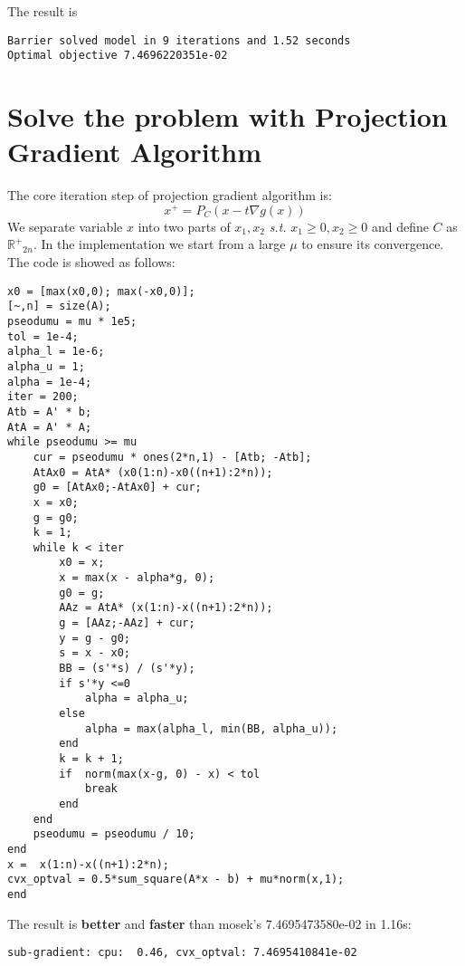 \documentclass[11pt, oneside]{article}   	%
\begin{document}
The result is 
\lstset{
 frame=single, 
breaklines=true,
language=MATLAB,
 }
\begin{lstlisting}
Barrier solved model in 9 iterations and 1.52 seconds
Optimal objective 7.4696220351e-02
\end{lstlisting}

\section{Solve the problem with Projection Gradient Algorithm}
The core iteration step of projection gradient algorithm is:
\begin{equation}
x ^ { + } = P _ { C } ( x - t \nabla g ( x ) )
\end{equation}
We separate variable $x$ into two parts of $x_{1}, x_{2}$ \textit{s.t.} $x_1\ge0, x_{2}\ge0$ and define $C$ as $\mathbb{R^{+}}_{2n}$.
In the implementation we start from a large $\mu$ to ensure its convergence. The code is showed as follows:
\lstset{
 frame=single, 
breaklines=true,
language=MATLAB,
 }
\begin{lstlisting}
x0 = [max(x0,0); max(-x0,0)];
[~,n] = size(A);
pseodumu = mu * 1e5;
tol = 1e-4;
alpha_l = 1e-6; 
alpha_u = 1;    
alpha = 1e-4;     
iter = 200;
Atb = A' * b;
AtA = A' * A;
while pseodumu >= mu
    cur = pseodumu * ones(2*n,1) - [Atb; -Atb];
    AtAx0 = AtA* (x0(1:n)-x0((n+1):2*n));
    g0 = [AtAx0;-AtAx0] + cur;
    x = x0;
    g = g0;
    k = 1;
    while k < iter
        x0 = x;
        x = max(x - alpha*g, 0);    
        g0 = g;
        AAz = AtA* (x(1:n)-x((n+1):2*n));
        g = [AAz;-AAz] + cur;
        y = g - g0;
        s = x - x0;
        BB = (s'*s) / (s'*y); 
        if s'*y <=0
            alpha = alpha_u;
        else
            alpha = max(alpha_l, min(BB, alpha_u));
        end
        k = k + 1;
        if  norm(max(x-g, 0) - x) < tol 
            break
        end
    end
    pseodumu = pseodumu / 10; 
end
x =  x(1:n)-x((n+1):2*n);
cvx_optval = 0.5*sum_square(A*x - b) + mu*norm(x,1);
end
\end{lstlisting}

The result is \textbf{better} and \textbf{faster} than mosek's 7.4695473580e-02 in 1.16s:
\lstset{
 frame=single, 
breaklines=true,
language=MATLAB,
 }
\begin{lstlisting}
sub-gradient: cpu:  0.46, cvx_optval: 7.4695410841e-02
\end{lstlisting}
\end{document}
